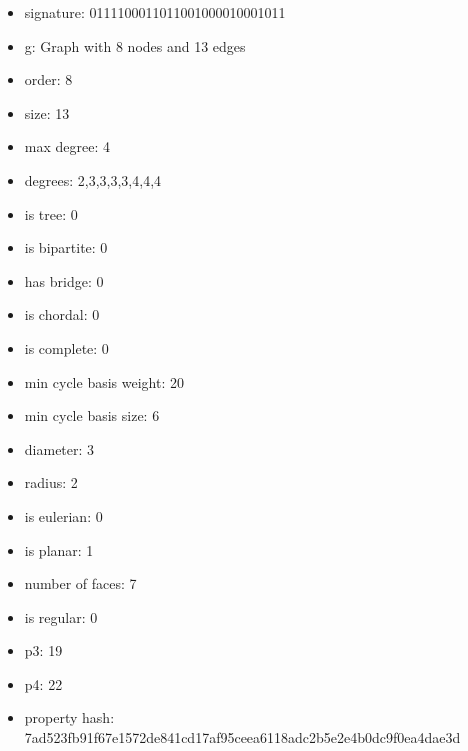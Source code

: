 \begin{itemize}
\item signature: 0111100011011001000010001011
\item g: Graph with 8 nodes and 13 edges
\item order: 8
\item size: 13
\item max degree: 4
\item degrees: 2,3,3,3,3,4,4,4
\item is tree: 0
\item is bipartite: 0
\item has bridge: 0
\item is chordal: 0
\item is complete: 0
\item min cycle basis weight: 20
\item min cycle basis size: 6
\item diameter: 3
\item radius: 2
\item is eulerian: 0
\item is planar: 1
\item number of faces: 7
\item is regular: 0
\item p3: 19
\item p4: 22
\item property hash: 7ad523fb91f67e1572de841cd17af95ceea6118adc2b5e2e4b0dc9f0ea4dae3d
\end{itemize}
\newpage
\begin{figure}
\end{figure}
